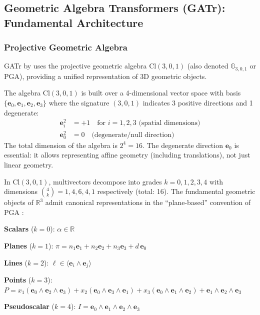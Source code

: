 \subsection{Geometric Algebra Transformers (GATr): Fundamental Architecture}

\subsubsection{Projective Geometric Algebra}

GATr by \citet{brehmer2023geometric} uses the projective geometric algebra $\text{Cl}(3,0,1)$ (also denoted $\mathbb{G}_{3,0,1}$ or PGA), providing a unified representation of 3D geometric objects.

\begin{definition}\label{def:algebra_proyectiva_3d}
The algebra $\text{Cl}(3,0,1)$ is built over a 4-dimensional vector space with basis $\{\mathbf{e}_0, \mathbf{e}_1, \mathbf{e}_2, \mathbf{e}_3\}$ where the signature $(3,0,1)$ indicates 3 positive directions and 1 degenerate:
\begin{align}
    \mathbf{e}_i^2 &= +1 \quad \text{for } i = 1,2,3 \text{ (spatial dimensions)} \\
    \mathbf{e}_0^2 &= 0 \quad \text{(degenerate/null direction)}
\end{align}
The total dimension of the algebra is $2^4 = 16$. The degenerate direction $\mathbf{e}_0$ is essential: it allows representing affine geometry (including translations), not just linear geometry.
\end{definition}

\begin{proposition}\label{prop:representacion_unificada_gatr}
In $\text{Cl}(3,0,1)$, multivectors decompose into grades $k = 0, 1, 2, 3, 4$ with dimensions $\binom{4}{k} = 1, 4, 6, 4, 1$ respectively (total: 16). The fundamental geometric objects of $\mathbb{R}^3$ admit canonical representations in the ``plane-based'' convention of PGA \citep{brehmer2023geometric}:

\textbf{Scalars} ($k=0$): $\alpha \in \mathbb{R}$

\textbf{Planes} ($k=1$): $\pi = n_1 \mathbf{e}_1 + n_2 \mathbf{e}_2 + n_3 \mathbf{e}_3 + d\, \mathbf{e}_0$

\textbf{Lines} ($k=2$): $\ell \in \langle \mathbf{e}_i \wedge \mathbf{e}_j \rangle$

\textbf{Points} ($k=3$): $P = x_1 (\mathbf{e}_0 \wedge \mathbf{e}_2 \wedge \mathbf{e}_3) + x_2 (\mathbf{e}_0 \wedge \mathbf{e}_3 \wedge \mathbf{e}_1) + x_3 (\mathbf{e}_0 \wedge \mathbf{e}_1 \wedge \mathbf{e}_2) + \mathbf{e}_1 \wedge \mathbf{e}_2 \wedge \mathbf{e}_3$

\textbf{Pseudoscalar} ($k=4$): $I = \mathbf{e}_0 \wedge \mathbf{e}_1 \wedge \mathbf{e}_2 \wedge \mathbf{e}_3$
\end{proposition}

